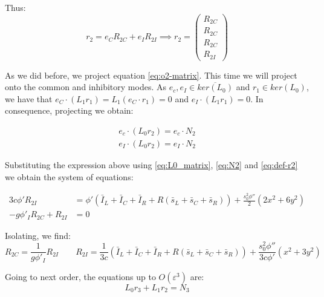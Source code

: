 \documentclass[12,twoside]{TFG-GM}
\theoremstyle{definition}
\theoremstyle{remark}
\begin{document}
Thus:
\begin{equation}
r_2 = e_CR_{2C} + e_IR_{2I} 
 \implies
r_{2} = \begin{pmatrix}R_{2C}\\R_{2C}\\R_{2C}\\R_{2I} \end{pmatrix}
\label{eq:def-r2}
\end{equation}


As we did before, we project equation \eqref{eq:o2-matrix}. This time we will project onto the common and inhibitory modes. As $e_c, e_I \in \overline{ker(L_0)}$ and $r_1\in ker(L_0)$, we have that $e_C\cdot(L_1r_1)=L_1(e_C\cdot r_1) = 0$ and $e_I\cdot (L_1r_1)=0$. In consequence, projecting we obtain:

\begin{equation}
\begin{aligned}
 e_c \cdot (L_0r_2 ) =  e_c \cdot  N_2\\[8pt]
 e_I  \cdot  (L_0r_2 )=  e_I \cdot  N_2
\end{aligned}
\end{equation}


Substituting the expression above using \eqref{eq:L0_matrix}, \eqref{eq:N2} and \eqref{eq:def-r2} we obtain the system of equations:

\begin{equation}
\begin{aligned}
3c\phi'R_{2I}  &= \phi'(\bar{I}_L+\bar{I}_C+\bar{I}_R + R(\bar{s}_L+ \bar{s}_C+ \bar{s}_R) )+ \frac{s_0^2\phi''}{2}\left(2x^2+6y^2 \right)\\[8pt]
-g\phi'_I R_{2C} +R_{2I} &= 0
\end{aligned}
\label{eq:}
\end{equation}


Isolating, we find:
\[
R_{2C} = \frac{1}{g\phi'_I}R_{2I} \qquad R_{2I} = \frac{1}{3c}(\bar{I}_L+\bar{I}_C+\bar{I}_R + R(\bar{s}_L+ \bar{s}_C+ \bar{s}_R))+ \frac{s_0^2\phi''}{3c\phi'}(x^2+3y^2)
\]

Going to next order, the equations up to $O(\varepsilon^3)$ are:
\begin{equation}
L_0r_3 + L _{1} r_{2} = N _{3}
\label{eq:o3-matrix}
\end{equation}
\end{document}
